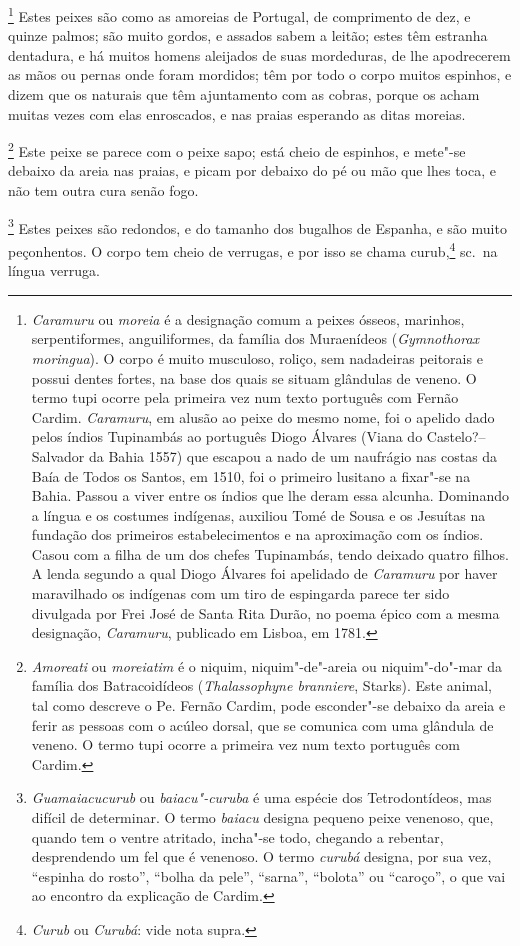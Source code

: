 \begin{linenumbers}
\footnote{ \textit{Caramuru} ou \textit{moreia} é a
designação comum a peixes ósseos, marinhos, serpentiformes,
anguiliformes, da família dos Muraenídeos (\textit{Gymnothorax
moringua}). O corpo é muito musculoso, roliço, sem nadadeiras peitorais
e possui dentes fortes, na base dos quais se situam glândulas de
veneno. O termo tupi ocorre pela primeira vez num texto português com
Fernão Cardim. \textit{Caramuru}, em alusão ao peixe do mesmo nome, foi
o apelido dado pelos índios Tupinambás ao português Diogo Álvares (Viana
do Castelo?--Salvador da Bahia 1557) que escapou a nado de um
naufrágio nas costas da Baía de Todos os Santos, em 1510, foi o
primeiro lusitano a fixar"-se na Bahia. Passou a viver entre os índios
que lhe deram essa alcunha. Dominando a língua e os costumes indígenas,
auxiliou Tomé de Sousa e os Jesuítas na fundação dos primeiros
estabelecimentos e na aproximação com os índios. Casou com a filha de
um dos chefes Tupinambás, tendo deixado quatro filhos. A lenda segundo a
qual Diogo Álvares foi apelidado de \textit{Caramuru} por haver
maravilhado os indígenas com um tiro de espingarda parece ter sido
divulgada por Frei José de Santa Rita Durão, no poema épico com a mesma
designação, \textit{Caramuru}, publicado em Lisboa, em 1781.} 
Estes peixes são como as amoreias de Portugal, de comprimento de dez,
e quinze palmos; são muito gordos, e assados sabem a leitão; estes têm
estranha dentadura, e há muitos homens aleijados de suas mordeduras, de
lhe apodrecerem as mãos ou pernas onde foram mordidos; têm por todo o
corpo muitos espinhos, e dizem que os naturais que têm ajuntamento com
as cobras, porque os acham muitas vezes com elas enroscados, e nas
praias esperando as ditas moreias.

\footnote{ \textit{Amoreati} ou \textit{moreiatim} 
é o niquim, niquim"-de"-areia ou niquim"-do"-mar da família dos
Batracoidídeos (\textit{Thalassophyne branniere}, Starks). Este animal,
tal como descreve o Pe. Fernão Cardim, pode esconder"-se debaixo da
areia e ferir as pessoas com o acúleo dorsal, que se comunica com uma
glândula de veneno. O termo tupi ocorre a primeira vez num texto
português com Cardim.} Este peixe se parece com o peixe
sapo; está cheio de espinhos, e mete"-se debaixo da areia nas praias, e
picam por debaixo do pé ou mão que lhes toca, e não tem outra cura
senão fogo.

\footnote{ \textit{Guamaiacucurub} ou
\textit{baiacu"-curuba} é uma espécie dos Tetrodontídeos, mas difícil
de determinar. O termo \textit{baiacu} designa pequeno peixe venenoso,
que, quando tem o ventre atritado, incha"-se todo, chegando a rebentar,
desprendendo um fel que é venenoso. O termo \textit{curubá} designa,
por sua vez, ``espinha do rosto'', ``bolha da pele'', ``sarna'', ``bolota'' ou
``caroço'', o que vai ao encontro da explicação de Cardim.} 
Estes peixes são redondos, e do tamanho dos bugalhos de Espanha, e são
muito peçonhentos. O corpo tem cheio de verrugas, e por isso se chama
curub,\footnote{ \textit{Curub} ou \textit{Curubá}: vide nota supra.} 
sc.~na língua verruga.


\end{linenumbers}
